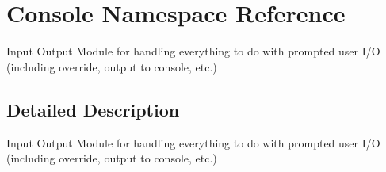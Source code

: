 \hypertarget{namespaceConsole}{\section{Console Namespace Reference}
\label{namespaceConsole}
}


Input Output Module for handling everything to do with prompted user I/\-O (including override, output to console, etc.)  




\subsection{Detailed Description}
Input Output Module for handling everything to do with prompted user I/\-O (including override, output to console, etc.) 